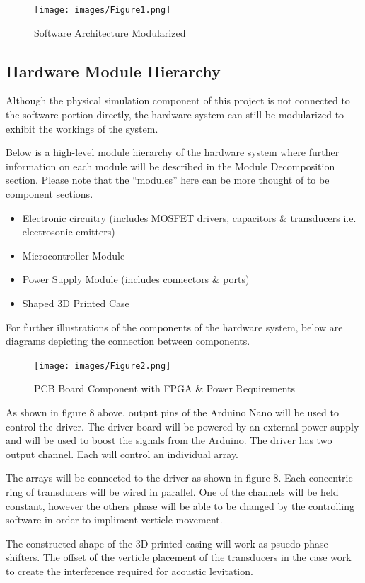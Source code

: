 \documentclass[12pt, titlepage]{article}
\begin{document}
\begin{figure}[htp]
  \centering
  \texttt{[image: images/Figure1.png]}
  \caption[Software Architecture Modules]{Software Architecture Modularized }
  \label{fig:figure1}
\end{figure}

\subsection{Hardware Module Hierarchy}
Although the physical simulation component of this project is not connected to the software portion directly, the hardware system can still be modularized to exhibit the workings of the system.
\par 
Below is a high-level module hierarchy of the hardware system where further information on each module will be described in the Module Decomposition section. Please note that the “modules” here can be more thought of to be component sections.
\par

\begin{itemize}
  \item Electronic circuitry (includes MOSFET drivers, capacitors \& transducers i.e. electrosonic emitters)
  \item Microcontroller Module
  \item Power Supply Module (includes connectors \& ports)
  \item Shaped 3D Printed Case
\end{itemize}

For further illustrations of the components of the hardware system, below are diagrams depicting the connection between components.
\par 

\begin{figure}[htp]
  \centering
  \texttt{[image: images/Figure2.png]}
  \caption[PCB and Power]{PCB Board Component with FPGA \& Power Requirements}
  \label{fig:figure2}
\end{figure}

As shown in figure 8 above, output pins of the Arduino Nano will be used to control the driver. The driver board will be powered by an external power supply and will be used to boost the signals from the Arduino. The driver has two output channel. Each will control an individual array.
\par 
The arrays will be connected to the driver as shown in figure 8. Each concentric ring of transducers will be wired in parallel. One of the channels will be held constant, however the others phase will be able to be changed by the controlling software in order to impliment verticle movement.
\par
The constructed shape of the 3D printed casing will work as psuedo-phase shifters. The offset of the verticle placement of the transducers in the case work to create the interference required for acoustic levitation. 
\end{document}
